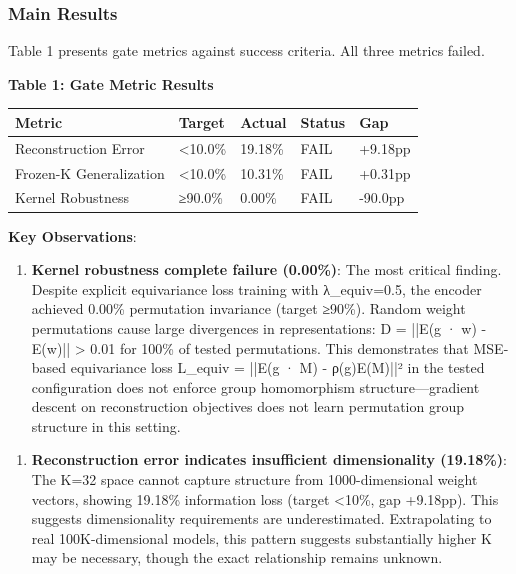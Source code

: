 
\subsubsection{Main Results}

Table 1 presents gate metrics against success criteria. All three metrics failed.

\textbf{Table 1: Gate Metric Results}

\begin{table}[htbp]
\centering
\begin{tabular}{lllll}
\toprule
Metric & Target & Actual & Status & Gap \\
\midrule
Reconstruction Error & <10.0\% & 19.18\% & FAIL & +9.18pp \\
Frozen-K Generalization & <10.0\% & 10.31\% & FAIL & +0.31pp \\
Kernel Robustness & ≥90.0\% & 0.00\% & FAIL & -90.0pp \\
\bottomrule
\end{tabular}
\end{table}

\textbf{Key Observations}:

\begin{enumerate}
\item \textbf{Kernel robustness complete failure (0.00\%)}: The most critical finding. Despite explicit equivariance loss training with λ_equiv=0.5, the encoder achieved 0.00\% permutation invariance (target ≥90\%). Random weight permutations cause large divergences in representations: D = ||E(g · w) - E(w)|| > 0.01 for 100\% of tested permutations. This demonstrates that MSE-based equivariance loss L_equiv = ||E(g · M) - ρ(g)E(M)||² in the tested configuration does not enforce group homomorphism structure—gradient descent on reconstruction objectives does not learn permutation group structure in this setting.
\end{enumerate}

\begin{enumerate}
\item \textbf{Reconstruction error indicates insufficient dimensionality (19.18\%)}: The K=32 space cannot capture structure from 1000-dimensional weight vectors, showing 19.18\% information loss (target <10\%, gap +9.18pp). This suggests dimensionality requirements are underestimated. Extrapolating to real 100K-dimensional models, this pattern suggests substantially higher K may be necessary, though the exact relationship remains unknown.
\end{enumerate}

